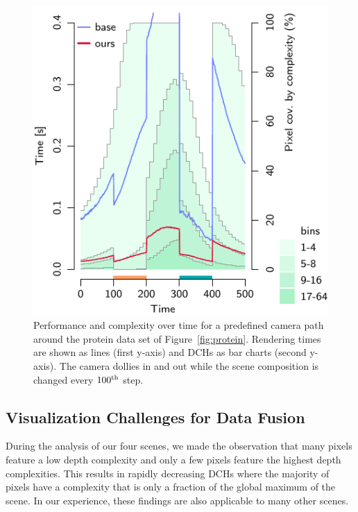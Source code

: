 \documentclass{egpubl}
\newcommand{\dch}{DCH}
\begin{document}
\begin{figure}[t]
\begin{minipage}{1.0\linewidth}
    \includegraphics[width=\linewidth]{figures/plot-viewdep-tall} 
  \end{minipage}
  \caption{\label{fig:viewdep}%
    Performance and complexity over time for a predefined camera path around the protein data set of Figure~\ref{fig:protein}. 
    Rendering times are shown as lines (first y-axis) and \dch{}s as bar charts (second y-axis). 
    The camera dollies in and out while the scene composition is changed every $100\textsuperscript{th}$ step. 
  }
\end{figure}



\subsection{Visualization Challenges for Data Fusion}
\label{sec:vischallenges}

During the analysis of our four scenes, we made the observation that many pixels feature a low depth complexity and only a few pixels feature the highest depth complexities. 
This results in rapidly decreasing \dch{}s where the majority of pixels have a complexity that is only a fraction of the global maximum of the scene.
In our experience, these findings are also applicable to many other scenes.
\end{document}
